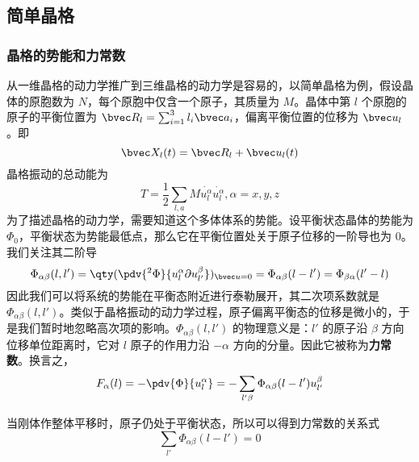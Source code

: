 
\subsection{简单晶格}
\subsubsection{晶格的势能和力常数}
从一维晶格的动力学推广到三维晶格的动力学是容易的，以简单晶格为例，假设晶体的原胞数为 $N$，每个原胞中仅含一个原子，其质量为 $M$。晶体中第 $l$ 个原胞的原子的平衡位置为 $\bvec R_l=\sum_{i=1}^3 l_i\bvec a_i$，偏离平衡位置的位移为 $\bvec u_l$。即
\begin{equation}
\bvec X_l(t)=\bvec R_l+\bvec u_l(t)
\end{equation}
晶格振动的总动能为
\begin{equation}
T=\frac{1}{2}\sum_{l,a} M \dot{u_l^\alpha}\dot{u_l^\alpha},\alpha=x,y,z
\end{equation}
为了描述晶格的动力学，需要知道这个多体体系的势能。设平衡状态晶体的势能为 $\Phi_0$，平衡状态为势能最低点，那么它在平衡位置处关于原子位移的一阶导也为 $0$。我们关注其二阶导
\begin{equation}
\Phi_{\alpha\beta}(l,l')=\qty(\pdv{^2\Phi}{u_l^\alpha\partial u_{l'}^\beta})_{\bvec u=0}=\Phi_{\alpha\beta}(l-l')=\Phi_{\beta\alpha}(l'-l)
\end{equation}
因此我们可以将系统的势能在平衡态附近进行泰勒展开，其二次项系数就是 $\Phi_{\alpha\beta}(l,l')$。类似于晶格振动的动力学过程，原子偏离平衡态的位移是微小的，于是我们暂时地忽略高次项的影响。$\Phi_{\alpha\beta}(l,l')$ 的物理意义是：$l'$ 的原子沿 $\beta$ 方向位移单位距离时，它对 $l$ 原子的作用力沿 $-\alpha$ 方向的分量。因此它被称为\textbf{力常数}。换言之，
\begin{equation}\label{latdyn_eq1}
F_\alpha(l)=-\pdv{\Phi}{u_l^\alpha}=-\sum_{l'\beta}\Phi_{\alpha\beta}(l-l')u_{l'}^\beta
\end{equation}

当刚体作整体平移时，原子仍处于平衡状态，所以可以得到力常数的关系式
\begin{equation}
\sum_{l'}\Phi_{\alpha\beta}(l-l')=0
\end{equation}
